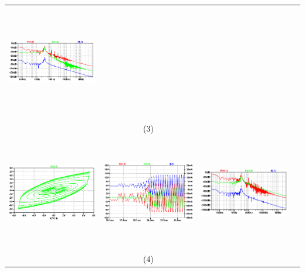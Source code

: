 \documentclass{rbf}
\begin{document}
\begin{table}[h]
\begin{tabular}{c c c c}
        \includegraphics[width=5cm,height=5cm]{r0/ro20.FFT_cap.png}&\\
        & (3) & \\
        \includegraphics[width=5cm,height=5cm]{r0/ro30_Cap.png}&
        \includegraphics[width=5cm,height=5cm]{r0/ro30TS_Cap.png}&
        \includegraphics[width=5cm,height=5cm]{r0/ro30.FFT_Cap.png}&\\
        & (4) & \\
        \hline
    \end{tabular}
\end{table}
\end{document}
